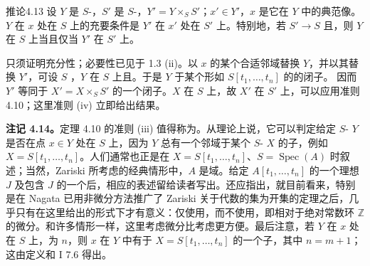 \begin{SGAresult}{推论}{4.13}
设 $Y$ 是 $S$-，$S'$ 是 $S$-，$Y'=Y\times_S S'$；$x'\in Y'$，$x$ 是它在 $Y$ 中的典范像。$Y$ 在 $x$ 处在 $S$ 上的充要条件是 $Y'$ 在 $x'$ 处在 $S'$ 上。特别地，若 $S'\to S$ 且，则 $Y$ 在 $S$ 上当且仅当 $Y'$ 在 $S'$ 上。
\end{SGAresult}
只须证明充分性；必要性已见于 1.3 (ii)。以 $x$ 的某个合适邻域替换 $Y$，并以其替换 $Y'$，可设 $S$ ，$Y$ 在 $S$ 上且。于是 $Y$ 于某个形如 $S[t_1,\ldots,t_n]$ 的的闭子。
因而 $Y'$ 等同于 $X'=X\times_S S'$ 的一个闭子。$X$ 在 $S$ 上，故 $X'$ 在 $S'$ 上，可以应用准则 4.10；这里准则 (iv) 立即给出结果。

\textbf{注记 4.14。}定理 4.10 的准则 (iii) 值得称为。从理论上说，它可以判定给定 $S$- $Y$ 是否在点 $x\in Y$ 处在 $S$ 上，因为 $Y$ 总有一个邻域于某个 $S$- $X$ 的子，例如 $X=S[t_1,\ldots,t_n]$。人们通常也正是在 $X=S[t_1,\ldots,t_n]$、$S=\operatorname{Spec}(A)$ 时叙述；当然，Zariski 所考虑的经典情形中，$A$ 是域。给定 $A[t_1,\ldots,t_n]$ 的一个理想 $J$ 及包含 $J$ 的一个后，相应的表述留给读者写出。还应指出，就目前看来，特别是在 Nagata 已用非微分方法推广了 Zariski 关于代数的集为开集的定理之后，几乎只有在这里给出的形式下才有意义：仅使用，而不使用，即相对于绝对常数环 $\mathbb Z$ 的微分。和许多情形一样，这里考虑微分比考虑更方便。最后注意，若 $Y$ 在 $x$ 处在 $S$ 上，为 $n$，则 $x$ 在 $Y$ 中有于 $X=S[t_1,\ldots,t_n]$ 的一个子，其中 $n=m+1$；这由定义和 I 7.6 得出。

